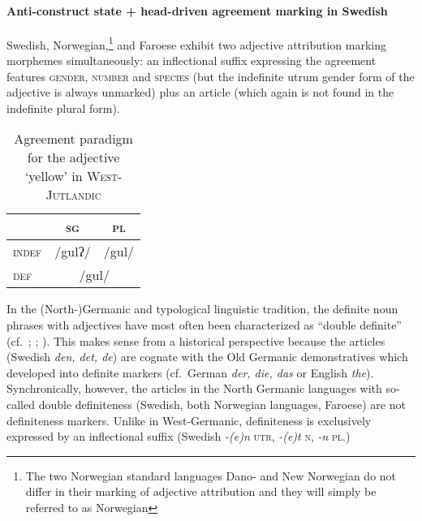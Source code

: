 \paragraph{Anti-construct state + head-driven agreement marking in Swedish}\label{swedish synchr}
Swedish, Norwegian,\footnote{The two Norwegian standard languages Dano- and New Norwegian do not differ in their marking of adjective attribution and they will simply be referred to as Norwegian} and Faroese exhibit two adjective attribution marking morphemes simultaneously: an inflectional suffix expressing the agreement features \textsc{gender}, \textsc{number} and \textsc{species} (but the indefinite utrum gender form of the adjective is always unmarked) plus an article (which again is not found in the indefinite plural form).

\begin{table}
\begin{center}
\begin{footnotesize}
\begin{tabular}[h]{l|cc}
\hline
\hline
		& \textsc{sg}	&\textsc{pl}\\
\hline
\textsc{indef}	&/gulʔ/	 	&/gul/\\ 	
\textsc{def}	&\multicolumn{2}{c}{/gul/}\\
\hline
\hline
\end{tabular}
\caption[Adjective paradigm for \textsc{West-Jutlandic}]{Agreement paradigm for the adjective ‘yellow’ in \textsc{West-Jutlandic} \cite{ringgaard1960}}\label{jutl agr paradigm}
\end{footnotesize}
\end{center}
\end{table}

In the (North-)Germanic and typological linguistic tradition, the definite noun phrases with adjectives have most often been characterized as “double definite” (cf.~\citealt{borjars1994}; \citealt{julien2003}; \citealt[354–355]{plank2003}). This makes sense from a historical perspective because the articles (Swedish \textit{den, det, de}) are cognate with the Old Germanic demonstratives which developed into definite markers (cf.~German \textit{der, die, das} or English \textit{the}). Synchronically, however, the articles in the North Germanic languages with so-called double definiteness (Swedish, both Norwegian languages, Faroese) are not definiteness markers. Unlike in West-Germanic, definiteness is exclusively expressed by an inflectional suffix (Swedish \textit{-(e)n} \textsc{utr}, \textit{-(e)t} \textsc{n}, \textit{-n} \textsc{pl}.)

